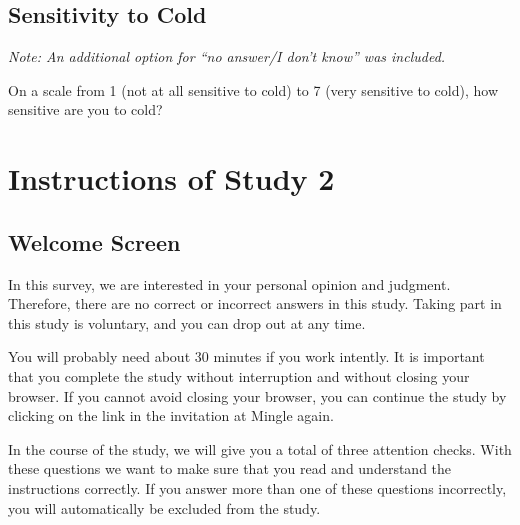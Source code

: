 \documentclass[egregdoesnotlikesansseriftitles]{scrartcl}
\begin{document}
\subsection*{Sensitivity to Cold}
\noindent\textit{Note: An additional option for ``no answer/I don't know'' was included.}\vspace{1ex}

\noindent On a scale from 1 (not at all sensitive to cold) to 7 (very sensitive to cold), how sensitive are you to cold? %


\clearpage
\section{Instructions of Study 2}\label{sec:app_study_2_instructions}
\subsection*{Welcome Screen}
In this survey, we are interested in your personal opinion and judgment. %
Therefore, there are no correct or incorrect answers in this study. %
Taking part in this study is voluntary, and you can drop out at any time. %

You will probably need about 30 minutes if you work intently. %
It is important that you complete the study without interruption and without closing your browser. %
If you cannot avoid closing your browser, you can continue the study by clicking on the link in the invitation at Mingle again. %

In the course of the study, we will give you a total of three attention checks. %
With these questions we want to make sure that you read and understand the instructions correctly. %
If you answer more than one of these questions incorrectly, you will automatically be excluded from the study. %
\end{document}
